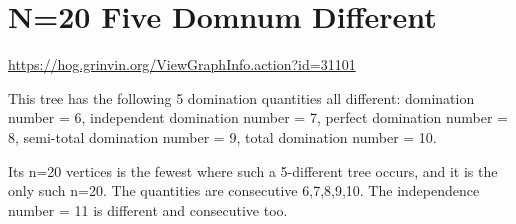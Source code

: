 \documentclass{article}
\begin{document}
\begin{center}
\end{center}


\section{N=20 Five Domnum Different}

\url{https://hog.grinvin.org/ViewGraphInfo.action?id=31101}

\smallskip

This tree has the following 5 domination quantities all different: \newline
domination number = 6, \newline
independent domination number = 7, \newline
perfect domination number = 8, \newline
semi-total domination number = 9, \newline
total domination number = 10.

Its n=20 vertices is the fewest where such a 5-different tree occurs, and it is the only such n=20.  The quantities are consecutive 6,7,8,9,10.  The independence number = 11 is different and consecutive too.
\end{document}
